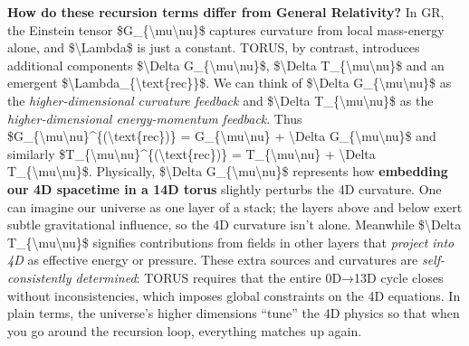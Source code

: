 \documentclass[
]{article}
\begin{document}
\textbf{How do these recursion terms differ from General Relativity?} In
GR, the Einstein tensor \$G\_\{\textbackslash mu\textbackslash nu\}\$
captures curvature from local mass-energy alone, and
\$\textbackslash Lambda\$ is just a constant. TORUS, by contrast,
introduces additional components \$\textbackslash Delta
G\_\{\textbackslash mu\textbackslash nu\}\$, \$\textbackslash Delta
T\_\{\textbackslash mu\textbackslash nu\}\$ and an emergent
\$\textbackslash Lambda\_\{\textbackslash text\{rec\}\}\$. We can think
of \$\textbackslash Delta G\_\{\textbackslash mu\textbackslash nu\}\$ as
the \emph{higher-dimensional curvature feedback} and
\$\textbackslash Delta T\_\{\textbackslash mu\textbackslash nu\}\$ as
the \emph{higher-dimensional energy-momentum feedback}. Thus
\$G\_\{\textbackslash mu\textbackslash nu\}\^{}\{(\textbackslash text\{rec\})\}
= G\_\{\textbackslash mu\textbackslash nu\} + \textbackslash Delta
G\_\{\textbackslash mu\textbackslash nu\}\$ and similarly
\$T\_\{\textbackslash mu\textbackslash nu\}\^{}\{(\textbackslash text\{rec\})\}
= T\_\{\textbackslash mu\textbackslash nu\} + \textbackslash Delta
T\_\{\textbackslash mu\textbackslash nu\}\$\hspace{0pt}. Physically,
\$\textbackslash Delta G\_\{\textbackslash mu\textbackslash nu\}\$
represents how \textbf{embedding our 4D spacetime in a 14D torus}
slightly perturbs the 4D curvature. One can imagine our universe as one
layer of a stack; the layers above and below exert subtle gravitational
influence, so the 4D curvature isn't alone\hspace{0pt}. Meanwhile
\$\textbackslash Delta T\_\{\textbackslash mu\textbackslash nu\}\$
signifies contributions from fields in other layers that \emph{project
into 4D} as effective energy or pressure\hspace{0pt}. These extra
sources and curvatures are \emph{self-consistently determined}: TORUS
requires that the entire 0D→13D cycle closes without inconsistencies,
which imposes global constraints on the 4D equations\hspace{0pt}. In
plain terms, the universe's higher dimensions ``tune'' the 4D physics so
that when you go around the recursion loop, everything matches up again.
\end{document}
